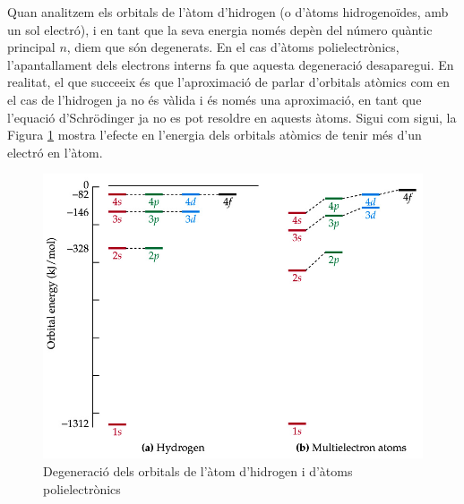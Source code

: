 Quan analitzem els orbitals de l'àtom d'hidrogen (o d'àtoms hidrogenoïdes, amb un sol electró), i en tant que la seva energia només depèn del número quàntic principal $n$, diem que són degenerats. En el cas d'àtoms polielectrònics, l'apantallament dels electrons interns fa que aquesta degeneració desaparegui. En realitat, el que succeeix és que l'aproximació de parlar d'orbitals atòmics com en el cas de l'hidrogen ja no és vàlida i és només una aproximació, en tant que l'equació d'Schrödinger ja no es pot resoldre en aquests àtoms.
Sigui com sigui, la Figura \ref{fig:degeneracio} mostra l'efecte en l'energia dels orbitals atòmics de tenir més d'un electró en l'àtom.
\begin{figure}[h]
\centering
\includegraphics[scale=0.35]{figures/degeneracio.png}
\caption{Degeneració dels orbitals de l'àtom d'hidrogen i d'àtoms polielectrònics}
\label{fig:degeneracio}
\end{figure}


